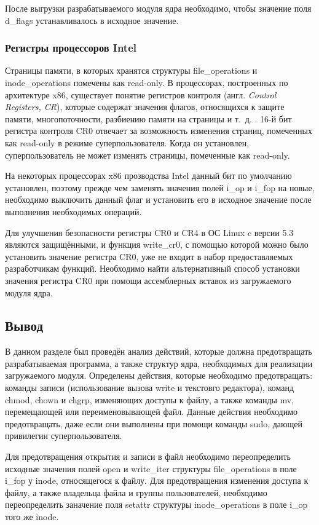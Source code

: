 После выгрузки разрабатываемого модуля ядра необходимо, чтобы значение поля d\_flags устанавливалось в исходное значение.


\subsubsection{Регистры процессоров Intel}

Страницы памяти, в которых хранятся структуры file\_operations и \linebreak inode\_operations помечены как read-only. В процессорах, построенных по архитектуре x86, существует понятие регистров контроля (англ. \textit{Control Registers, CR}), которые содержат значения флагов, относящихся к защите памяти, многопоточности, разбиению памяти на страницы и т.~д. \cite{intel-manual}. 16-й бит регистра контроля CR0 отвечает за возможность изменения страниц, помеченных как read-only в режиме суперпользователя. Когда он установлен, суперпользователь не может изменять страницы, помеченные как read-only.

На некоторых процессорах x86 прозводства Intel данный бит по умолчанию установлен, поэтому прежде чем заменять значения полей i\_op и i\_fop на новые, необходимо выключить данный флаг и установить его в исходное значение после выполнения необходимых операций.

Для улучшения безопасности регистры CR0 и CR4 в ОС Linux c версии 5.3 являются защищёнными, и функция write\_cr0, с помощью которой можно было установить значение регистра CR0, уже не входит в набор предоставляемых разработчикам функций. Необходимо найти альтернативный способ установки значения регистра CR0 при помощи ассемблерных вставок из загружаемого модуля ядра.

\subsection*{Вывод}
В данном разделе был проведён анализ действий, которые должна предотвращать разрабатываемая программа, а также структур ядра, необходимых для реализации загружаемого модуля.
Определены действия, которые необходимо предотвращать: команды записи (использование вызова write и текстовго редактора), команд chmod, chown и chgrp, изменяющих доступы к файлу, а также команды mv, перемещающей или переименовывающей файл. Данные действия необходимо предотвращать, даже если они выполнены при помощи команды sudo, дающей привилегии суперпользователя.

Для предотвращения открытия и записи в файл необходимо переопределить исходные значения полей open и write\_iter структуры file\_operations в поле i\_fop у inode, относящегося к файлу.
Для предотвращения изменения доступа к файлу, а также владельца файла и группы пользователей, необходимо переопределить заначение поля setattr структуры inode\_operations в поле i\_op того же inode.

